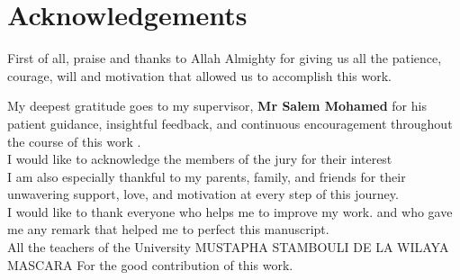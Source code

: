 \chapter*{Acknowledgements}
\thispagestyle{empty}
\begin{center}
	
	
	First of all, praise and thanks to Allah Almighty for giving us all the patience, courage, will and motivation that allowed us to accomplish this work.\\ 
	\vspace{0.3cm}
	
	My deepest gratitude goes to my supervisor, \textbf{Mr Salem Mohamed } for his patient guidance, insightful feedback, and continuous encouragement throughout the course of this work .\\
	\vspace{0.3cm}
	I would like to acknowledge the members of the jury for their interest  \\
	\vspace{0.3cm}
    I am also especially thankful to my parents, family, and friends for their unwavering support, love, and motivation at every step of this journey. \\
    \vspace{0.3cm}
    I would like to thank everyone who helps me to improve my work. and who gave me any remark that helped me to perfect this manuscript.\\
	\vspace{0.3cm}
	All the teachers of the University MUSTAPHA STAMBOULI DE LA WILAYA MASCARA For the good contribution of this work.
\end{center}

